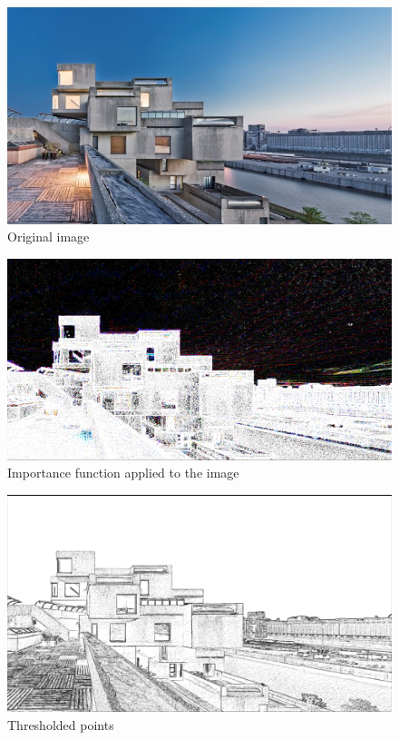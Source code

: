 \begin{figure}[H]
    \centering
    \includegraphics[width=\linewidth]{Figures/vectorization_images/original.jpg}
    \caption{Original image}
    \label{fig:arch_original}
\end{figure}

\begin{figure}[H]
    \centering
    \includegraphics[width=\linewidth]{Figures/vectorization_images/importance.png}
    \caption{Importance function applied to the image}
    \label{fig:arch_importance}
\end{figure}

\begin{figure}[H]
    \centering
    \includegraphics[width=\linewidth]{Figures/vectorization_images/thresholded.png}
    \caption{Thresholded points}
    \label{fig:arch_thresholded}
\end{figure}

